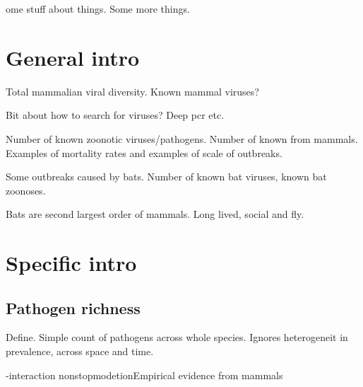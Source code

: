

ome stuff about things. Some more things.  \blindtext

\section{General intro}

Total mammalian viral diversity.
Known mammal viruses?

Bit about how to search for viruses? Deep pcr etc.



Number of known zoonotic viruses/pathogens.
Number of known from mammals.
Examples of mortality rates and examples of scale of outbreaks.


Some outbreaks caused by bats.
Number of known bat viruses, known bat zoonoses.

Bats are second largest order of mammals.
Long lived, social and fly.


\section{Specific  intro}
\subsection{Pathogen richness}

Define.
Simple count of pathogens across whole species.
Ignores heterogeneit in prevalence, across space and time.








\tmpseclatex -interaction nonstopmodetion{Empirical evidence from mammals}


